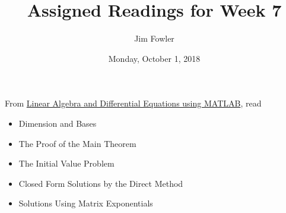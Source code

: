 \documentclass{homework}
\author{Jim Fowler}
\title{Assigned Readings for Week 7}
\date{Monday, October 1, 2018}
\begin{document}
\maketitle

From \href{/courses/43735/files/folder/textbooks}{Linear Algebra and Differential Equations using MATLAB}, read 
\begin{itemize}
\item {} Dimension and Bases
\item {} The Proof of the Main Theorem
\item {} The Initial Value Problem
\item {} Closed Form Solutions by the Direct Method
\item {} Solutions Using Matrix Exponentials
\end{itemize}
\end{document}

